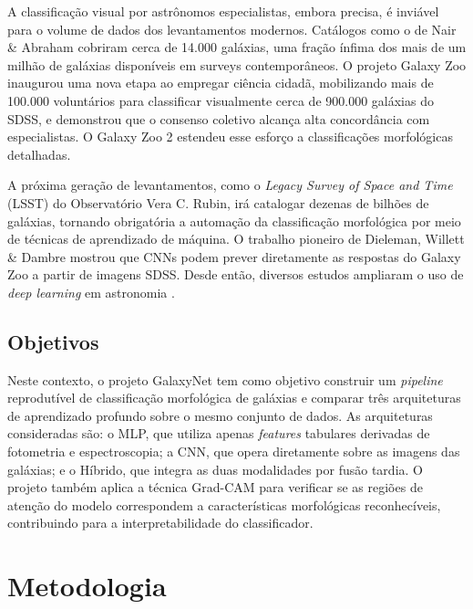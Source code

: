 \documentclass[12pt, a4paper]{article}
\begin{document}
A classificação visual por astrônomos especialistas, embora precisa, é
inviável para o volume de dados dos levantamentos modernos. Catálogos como
o de Nair \& Abraham \cite{nair2010} cobriram cerca de 14.000 galáxias, uma
fração ínfima dos mais de um milhão de galáxias disponíveis em surveys
contemporâneos. O projeto Galaxy Zoo \cite{lintott2008} inaugurou uma nova
etapa ao empregar ciência cidadã, mobilizando mais de 100.000 voluntários
para classificar visualmente cerca de 900.000 galáxias do SDSS, e demonstrou
que o consenso coletivo alcança alta concordância com especialistas. O
Galaxy Zoo 2 \cite{willett2013} estendeu esse esforço a classificações
morfológicas detalhadas.

A próxima geração de levantamentos, como o \textit{Legacy Survey of Space
and Time} (LSST) do Observatório Vera C. Rubin, irá catalogar dezenas de
bilhões de galáxias, tornando obrigatória a automação da classificação
morfológica por meio de técnicas de aprendizado de máquina. O trabalho
pioneiro de Dieleman, Willett \& Dambre \cite{dieleman2015} mostrou que CNNs
podem prever diretamente as respostas do Galaxy Zoo a partir de imagens
SDSS. Desde então, diversos estudos ampliaram o uso de \textit{deep
learning} em astronomia
\cite{dominguez2018,walmsley2022,huertascompany2023}.

\subsection{Objetivos}

Neste contexto, o projeto GalaxyNet tem como objetivo construir um
\textit{pipeline} reprodutível de classificação morfológica de galáxias e
comparar três arquiteturas de aprendizado profundo sobre o mesmo conjunto
de dados. As arquiteturas consideradas são: o MLP, que utiliza apenas
\textit{features} tabulares derivadas de fotometria e espectroscopia; a
CNN, que opera diretamente sobre as imagens das galáxias; e o Híbrido,
que integra as duas modalidades por fusão tardia. O projeto também
aplica a técnica Grad-CAM para verificar se as regiões de atenção do
modelo correspondem a características morfológicas reconhecíveis,
contribuindo para a interpretabilidade do classificador.

\section{Metodologia}
\end{document}
